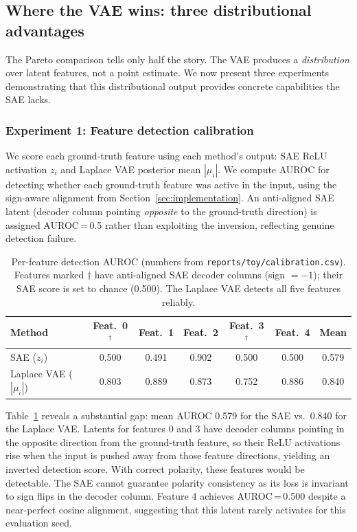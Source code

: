 \documentclass{article}
\begin{document}
\subsection{Where the VAE wins: three distributional advantages}

The Pareto comparison tells only half the story. The VAE produces a \emph{distribution} over latent features, not a point estimate. We now present three experiments demonstrating that this distributional output provides concrete capabilities the SAE lacks.

\subsubsection{Experiment 1: Feature detection calibration}

We score each ground-truth feature using each method's output: SAE ReLU activation $z_i$ and Laplace VAE posterior mean $|\mu_i|$. We compute AUROC for detecting whether each ground-truth feature was active in the input, using the sign-aware alignment from Section~\ref{sec:implementation}. An anti-aligned SAE latent (decoder column pointing \emph{opposite} to the ground-truth direction) is assigned AUROC\,=\,0.5 rather than exploiting the inversion, reflecting genuine detection failure.

\begin{table}[t]
  \caption{Per-feature detection AUROC (numbers from \texttt{reports/toy/calibration.csv}). Features marked $\dagger$ have anti-aligned SAE decoder columns (sign $= -1$); their SAE score is set to chance (0.500). The Laplace VAE detects all five features reliably.}
  \label{tab:auroc}
  \centering
  \begin{tabular}{lcccccc}
    \toprule
    Method & Feat.\ 0$^\dagger$ & Feat.\ 1 & Feat.\ 2 & Feat.\ 3$^\dagger$ & Feat.\ 4 & Mean \\
    \midrule
    SAE ($z_i$)              & 0.500 & 0.491 & 0.902 & 0.500 & 0.500 & 0.579 \\
    Laplace VAE ($|\mu_i|$)  & 0.803 & 0.889 & 0.873 & 0.752 & 0.886 & 0.840 \\
    \bottomrule
  \end{tabular}
\end{table}

Table~\ref{tab:auroc} reveals a substantial gap: mean AUROC 0.579 for the SAE vs.\ 0.840 for the Laplace VAE. Latents for features 0 and 3 have decoder columns pointing in the opposite direction from the ground-truth feature, so their ReLU activations rise when the input is pushed away from those feature directions, yielding an inverted detection score. With correct polarity, these features would be detectable. The SAE cannot guarantee polarity consistency as its loss is invariant to sign flips in the decoder column. Feature 4 achieves AUROC\,=\,0.500 despite a near-perfect cosine alignment, suggesting that this latent rarely activates for this evaluation seed.
\end{document}
